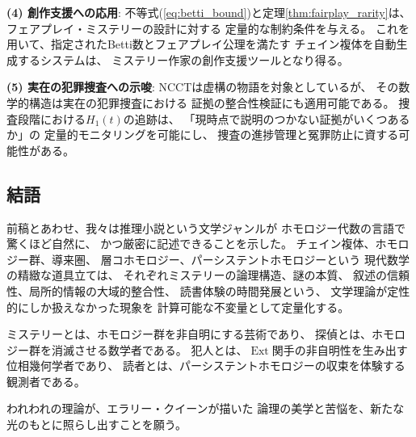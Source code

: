 \documentclass[12pt,twocolumn]{ltjsarticle}
\newcommand{\Ext}{\operatorname{Ext}}
\begin{document}
\textbf{(4) 創作支援への応用}:
不等式(\ref{eq:betti_bound})と定理\ref{thm:fairplay_rarity}は、
フェアプレイ・ミステリーの設計に対する
定量的な制約条件を与える。
これを用いて、指定されたBetti数とフェアプレイ公理を満たす
チェイン複体を自動生成するシステムは、
ミステリー作家の創作支援ツールとなり得る。

\textbf{(5) 実在の犯罪捜査への示唆}:
NCCTは虚構の物語を対象としているが、
その数学的構造は実在の犯罪捜査における
証拠の整合性検証にも適用可能である。
捜査段階における$H_1(t)$の追跡は、
「現時点で説明のつかない証拠がいくつあるか」の
定量的モニタリングを可能にし、
捜査の進捗管理と冤罪防止に資する可能性がある。


\subsection{結語}

前稿とあわせ、我々は推理小説という文学ジャンルが
ホモロジー代数の言語で驚くほど自然に、
かつ厳密に記述できることを示した。
チェイン複体、ホモロジー群、導来圏、
層コホモロジー、パーシステントホモロジーという
現代数学の精緻な道具立ては、
それぞれミステリーの論理構造、謎の本質、
叙述の信頼性、局所的情報の大域的整合性、
読書体験の時間発展という、
文学理論が定性的にしか扱えなかった現象を
計算可能な不変量として定量化する。

ミステリーとは、ホモロジー群を非自明にする芸術であり、
探偵とは、ホモロジー群を消滅させる数学者である。
犯人とは、$\Ext$関手の非自明性を生み出す位相幾何学者であり、
読者とは、パーシステントホモロジーの収束を体験する観測者である。

われわれの理論が、エラリー・クイーンが描いた
論理の美学と苦悩を、新たな光のもとに照らし出すことを願う。
\end{document}
